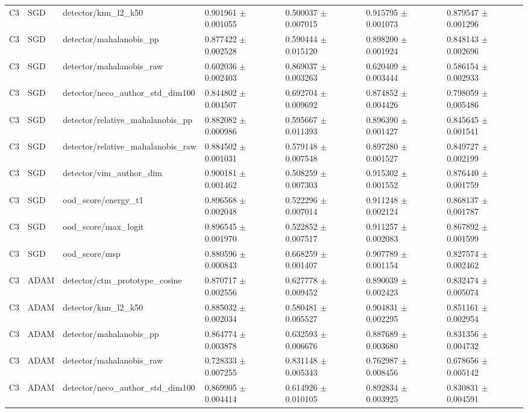\begin{longtable}{lllllll}
C3 & SGD & detector/knn\_l2\_k50 & 0.901961 $\pm$ 0.001055 & 0.500037 $\pm$ 0.007015 & 0.915795 $\pm$ 0.001073 & 0.879547 $\pm$ 0.001296 \\
C3 & SGD & detector/mahalanobis\_pp & 0.877422 $\pm$ 0.002528 & 0.590444 $\pm$ 0.015120 & 0.898200 $\pm$ 0.001924 & 0.848143 $\pm$ 0.002696 \\
C3 & SGD & detector/mahalanobis\_raw & 0.602036 $\pm$ 0.002403 & 0.869037 $\pm$ 0.003263 & 0.620409 $\pm$ 0.003444 & 0.586154 $\pm$ 0.002933 \\
C3 & SGD & detector/neco\_author\_std\_dim100 & 0.844802 $\pm$ 0.004507 & 0.692704 $\pm$ 0.009692 & 0.874852 $\pm$ 0.004426 & 0.798059 $\pm$ 0.005486 \\
C3 & SGD & detector/relative\_mahalanobis\_pp & 0.882082 $\pm$ 0.000986 & 0.595667 $\pm$ 0.011393 & 0.896390 $\pm$ 0.001427 & 0.845645 $\pm$ 0.001541 \\
C3 & SGD & detector/relative\_mahalanobis\_raw & 0.884502 $\pm$ 0.001031 & 0.579148 $\pm$ 0.007548 & 0.897280 $\pm$ 0.001527 & 0.849727 $\pm$ 0.002199 \\
C3 & SGD & detector/vim\_author\_dim & 0.900181 $\pm$ 0.001462 & 0.508259 $\pm$ 0.007303 & 0.915302 $\pm$ 0.001552 & 0.876440 $\pm$ 0.001759 \\
C3 & SGD & ood\_score/energy\_t1 & 0.896568 $\pm$ 0.002048 & 0.522296 $\pm$ 0.007014 & 0.911248 $\pm$ 0.002124 & 0.868137 $\pm$ 0.001787 \\
C3 & SGD & ood\_score/max\_logit & 0.896545 $\pm$ 0.001970 & 0.522852 $\pm$ 0.007517 & 0.911257 $\pm$ 0.002083 & 0.867892 $\pm$ 0.001599 \\
C3 & SGD & ood\_score/msp & 0.880596 $\pm$ 0.000843 & 0.668259 $\pm$ 0.001407 & 0.907789 $\pm$ 0.001154 & 0.827574 $\pm$ 0.002462 \\
C3 & ADAM & detector/ctm\_prototype\_cosine & 0.870717 $\pm$ 0.002556 & 0.627778 $\pm$ 0.009452 & 0.890039 $\pm$ 0.002423 & 0.832474 $\pm$ 0.005074 \\
C3 & ADAM & detector/knn\_l2\_k50 & 0.885032 $\pm$ 0.002034 & 0.580481 $\pm$ 0.005527 & 0.904831 $\pm$ 0.002295 & 0.851161 $\pm$ 0.002954 \\
C3 & ADAM & detector/mahalanobis\_pp & 0.864774 $\pm$ 0.003878 & 0.632593 $\pm$ 0.006676 & 0.887689 $\pm$ 0.003680 & 0.831356 $\pm$ 0.004732 \\
C3 & ADAM & detector/mahalanobis\_raw & 0.728333 $\pm$ 0.007255 & 0.831148 $\pm$ 0.005343 & 0.762987 $\pm$ 0.008456 & 0.678656 $\pm$ 0.005142 \\
C3 & ADAM & detector/neco\_author\_std\_dim100 & 0.869905 $\pm$ 0.004414 & 0.614926 $\pm$ 0.010105 & 0.892834 $\pm$ 0.003925 & 0.830831 $\pm$ 0.004591 \\

\end{longtable}
